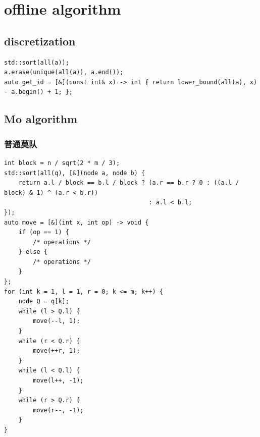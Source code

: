 \documentclass[UTF8, a4paper, titlepage, twoside]{ctexart}
\begin{document}
\newpage
\section{ offline algorithm}
\subsection{ discretization }
\begin{lstlisting}[style=cpp]
std::sort(all(a));
a.erase(unique(all(a)), a.end());
auto get_id = [&](const int& x) -> int { return lower_bound(all(a), x) - a.begin() + 1; };
\end{lstlisting}

\subsection{ Mo algorithm }
\subsubsection*{ 普通莫队 }
\begin{lstlisting}[style=cpp]
int block = n / sqrt(2 * m / 3);
std::sort(all(q), [&](node a, node b) {
    return a.l / block == b.l / block ? (a.r == b.r ? 0 : ((a.l / block) & 1) ^ (a.r < b.r))
                                        : a.l < b.l;
});
auto move = [&](int x, int op) -> void {
    if (op == 1) {
        /* operations */
    } else {
        /* operations */
    }
};
for (int k = 1, l = 1, r = 0; k <= m; k++) {
    node Q = q[k];
    while (l > Q.l) {
        move(--l, 1);
    }
    while (r < Q.r) {
        move(++r, 1);
    }
    while (l < Q.l) {
        move(l++, -1);
    }
    while (r > Q.r) {
        move(r--, -1);
    }
}
\end{lstlisting}
\end{document}

